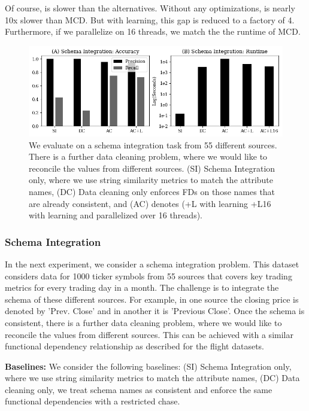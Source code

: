 Of course, \sys is slower than the alternatives. 
Without any optimizations, \sys is nearly 10x slower than MCD.
But with learning, this gap is reduced to a factory of 4.
Furthermore, if we parallelize on 16 threads, we match the the runtime of MCD.

\begin{figure}
    \centering
    \includegraphics[width=\columnwidth]{exp/exp3.png}
    \caption{We evaluate \sys on a schema integration task from 55 different sources. There is a further data cleaning problem, where we would like to reconcile the values from different sources.
    (SI) Schema Integration only, where we use string similarity metrics to match the attribute names, (DC) Data cleaning only enforces FDs on those names that are already consistent, and  (AC) denotes \sys (+L with learning +L16 with learning and parallelized over 16 threads). \label{exp3a}}
\end{figure}

\subsubsection{Schema Integration}
In the next experiment, we consider a schema integration problem. This dataset considers data for 1000 ticker symbols from 55 sources that covers key trading metrics for every trading day in a month.
The challenge is to integrate the schema of these different sources. For example,
in one source the closing price is denoted by 'Prev. Close' and in another it is 'Previous Close'.
Once the schema is consistent, there is a further data cleaning problem, where we would like to reconcile the values from different sources. This can be achieved with a similar functional dependency relationship as described for the flight datasets.

\vspace{0.5em}\noindent\textbf{Baselines: } We consider the following baselines: (SI) Schema Integration only, where we use string similarity metrics to match the attribute names, (DC) Data cleaning only, we treat schema names as consistent and enforce the same functional dependencies with a restricted chase.

